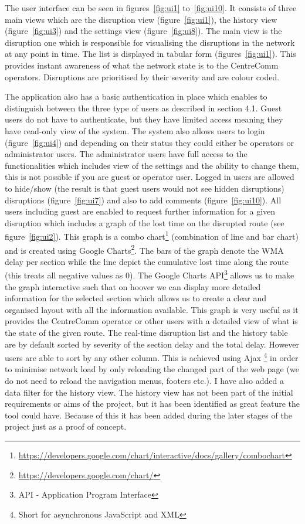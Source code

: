 The user interface can be seen in figures~\ref{fig:ui1} to~\ref{fig:ui10}. It consists of three main views which are the disruption view (figure~\ref{fig:ui1}), the history view (figure~\ref{fig:ui3}) and the settings view (figure~\ref{fig:ui8}). The main view is the disruption one which is responsible for visualising the disruptions in the network at any point in time. The list is displayed in tabular form (figures~\ref{fig:ui1}). This provides instant awareness of what the network state is to the CentreComm operators. Disruptions are prioritised by their severity and are colour coded.

The application also has a basic authentication in place which enables to distinguish between the three type of users as described in section 4.1. Guest users do not have to authenticate, but they have limited access meaning they have read-only view of the system. The system also allows users to login (figure~\ref{fig:ui4}) and depending on their status they could either be operators or administrator users. The administrator users have full access to the functionalities which includes view of the settings and the ability to change them, this is not possible if you are guest or operator user. Logged in users are allowed to hide/show (the result is that guest users would not see hidden disruptions) disruptions (figure~\ref{fig:ui7}) and also to add comments (figure~\ref{fig:ui10}). All users including guest are enabled to request further information for a given disruption which includes a graph of the lost time on the disrupted route (see figure~\ref{fig:ui2}). This graph is a combo chart\footnote{\url{https://developers.google.com/chart/interactive/docs/gallery/combochart}} (combination of line and bar chart) and is created using Google Charts\footnote{\url{https://developers.google.com/chart/}}. The bars of the graph denote the WMA delay per section while the line depict the cumulative lost time along the route (this treats all negative values as $0$). The Google Charts API\footnote{API - Application Program Interface} allows us to make the graph interactive such that on hoover we can display more detailed information for the selected section which allows us to create a clear and organised layout with all the information available. This graph is very useful as it provides the CentreComm operator or other users with a detailed view of what is the state of the given route. The real-time disruption list and the history table are by default sorted by severity of the section delay and the total delay. However users are able to sort by any other column. This is achieved using Ajax \footnote{Short for asynchronous JavaScript and XML} in order to minimise network load by only reloading the changed part of the web page (we do not need to reload the navigation menus, footers etc.). I have also added a data filter for the history view. The history view has not been part of the initial requirements or aims of the project, but it has been identified as great feature the tool could have. Because of this it has been added during the later stages of the project just as a proof of concept.

